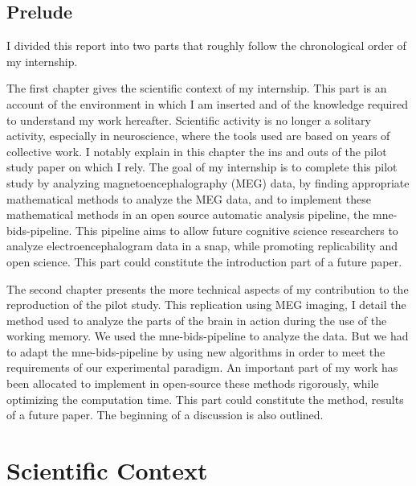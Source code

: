 \section*{Prelude}

I divided this report into two parts that roughly follow the chronological order of my internship.

The first chapter gives the scientific context of my internship. This part is an account of the environment in which I am inserted and of the knowledge required to understand my work hereafter. Scientific activity is no longer a solitary activity, especially in neuroscience, where the tools used are based on years of collective work. I notably explain in this chapter the ins and outs of the pilot study paper \cite{herbst2021abstracting} on which I rely. The goal of my internship is to complete this pilot study by analyzing magnetoencephalography (MEG) data, by finding appropriate mathematical methods to analyze the MEG data, and to implement these mathematical methods in an open source automatic analysis pipeline, the mne-bids-pipeline. This pipeline aims to allow future cognitive science researchers to analyze electroencephalogram data in a snap, while promoting replicability and open science. This part could constitute the introduction part of a future paper.

The second chapter presents the more technical aspects of my contribution to the reproduction of the pilot study. This replication using MEG imaging, I detail the method used to analyze the parts of the brain in action during the use of the working memory. We used the mne-bids-pipeline to analyze the data. But we had to adapt the mne-bids-pipeline by using new algorithms in order to meet the requirements of our experimental paradigm. An important part of my work has been allocated to implement in open-source these methods rigorously, while optimizing the computation time. This part could constitute the method, results of a future paper. The beginning of a discussion is also outlined.

\chapter{Scientific Context}


